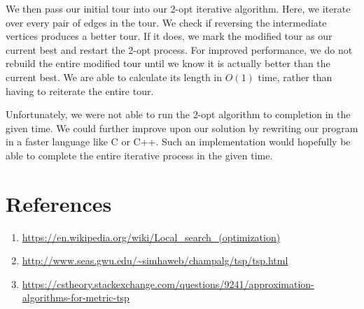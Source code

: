 \documentclass[12pt,letterpaper]{article}
\begin{document}
We then pass our initial tour into our 2-opt iterative algorithm. Here, we
iterate over every pair of edges in the tour. We check if reversing the
intermediate vertices produces a better tour. If it does, we mark the modified
tour as our current best and restart the 2-opt process. For improved
performance, we do not rebuild the entire modified tour until we know it is
actually better than the current best. We are able to calculate its length in
$O(1)$ time, rather than having to reiterate the entire tour.

Unfortunately, we were not able to run the 2-opt algorithm to completion in the
given time. We could further improve upon our solution by rewriting our program
in a faster language like C or C++. Such an implementation would hopefully be
able to complete the entire iterative process in the given time.

\section{References}
\begin{enumerate}
  \item \url{https://en.wikipedia.org/wiki/Local_search_(optimization)}
  \item \url{http://www.seas.gwu.edu/~simhaweb/champalg/tsp/tsp.html}
  \item \url{https://cstheory.stackexchange.com/questions/9241/approximation-algorithms-for-metric-tsp}
\end{enumerate}
\end{document}
